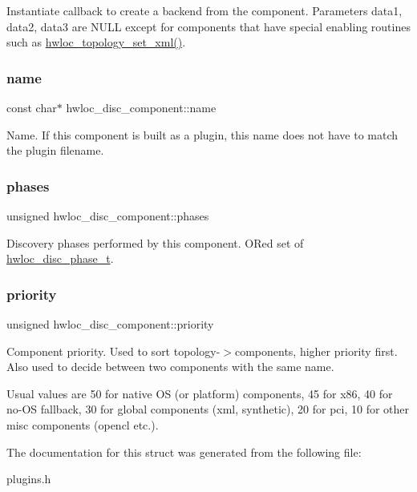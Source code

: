 Instantiate callback to create a backend from the component. Parameters data1, data2, data3 are N\+U\+LL except for components that have special enabling routines such as \hyperlink{a00192_ga879439b7ee99407ee911b3ac64e9a25e}{hwloc\+\_\+topology\+\_\+set\+\_\+xml()}. 

\mbox{\label{a00366_a4064c3b5d9213027e87caebef380a840}} 
\subsubsection{\texorpdfstring{name}{name}}
{\footnotesize\ttfamily const char$\ast$ hwloc\+\_\+disc\+\_\+component\+::name}



Name. If this component is built as a plugin, this name does not have to match the plugin filename. 

\mbox{\label{a00366_a61ad3151efa02e3dbad5d919758f9c90}} 
\subsubsection{\texorpdfstring{phases}{phases}}
{\footnotesize\ttfamily unsigned hwloc\+\_\+disc\+\_\+component\+::phases}



Discovery phases performed by this component. OR\textquotesingle{}ed set of \hyperlink{a00228_ga3beef9f01f1c08c5700aec066fcec025}{hwloc\+\_\+disc\+\_\+phase\+\_\+t}. 

\mbox{\label{a00366_ae86d283c272c5ae24073a235efbf6b59}} 
\subsubsection{\texorpdfstring{priority}{priority}}
{\footnotesize\ttfamily unsigned hwloc\+\_\+disc\+\_\+component\+::priority}



Component priority. Used to sort topology-\/$>$components, higher priority first. Also used to decide between two components with the same name. 

Usual values are 50 for native OS (or platform) components, 45 for x86, 40 for no-\/\+OS fallback, 30 for global components (xml, synthetic), 20 for pci, 10 for other misc components (opencl etc.). 

The documentation for this struct was generated from the following file\+:\begin{DoxyCompactItemize}
\item 
plugins.\+h\end{DoxyCompactItemize}
